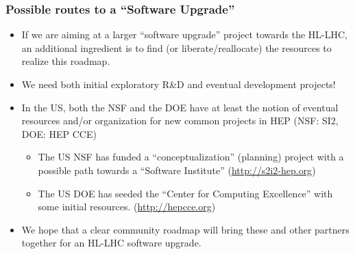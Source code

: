 \begin{frame}
\frametitle{Possible routes to a ``Software Upgrade''}

\begin{itemize}
\item If we are aiming at a larger ``software upgrade'' project towards the HL-LHC, an additional ingredient is to find (or liberate/reallocate) the resources to realize this roadmap. 
\item We need both initial exploratory R\&D and eventual development projects!
\item In the US, both the NSF and the DOE have at least the notion of eventual resources and/or organization for new common projects in HEP (NSF: SI2, DOE: HEP CCE)
  \begin{itemize}
   \item The US NSF has funded a ``conceptualization'' (planning) project with a possible path towards a ``Software Institute'' (\url{http://s2i2-hep.org})
   \item The US DOE has seeded the ``Center for Computing Excellence'' with some initial resources. (\url{http://hepcce.org})
  \end{itemize}
\item We hope that a clear community roadmap will bring these and other partners together for an HL-LHC software upgrade.
\end{itemize}

\end{frame}


